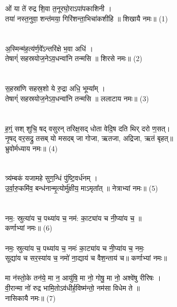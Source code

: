 \subsection{}
ओं या ते॑ रुद्र शि॒वा त॒नूरघो॒राऽपा॑पकाशिनी ।\\
तया॑ नस्त॒नुवा॒ शन्त॑मया॒ गिरि॑शन्ता॒भिचा॑कशीहि ॥ शिखायै नमः॥ (1)\\
{\small{}}\\
\\
अ॒स्मिन्म॑ह॒त्य॑र्ण॒वे᳚ऽन्तरि॑क्षे भ॒वा अधि॑ ।\\
तेषाग्ं॑ सहस्रयोज॒नेऽव॒धन्वा॑नि तन्मसि ॥ शिरसे नमः॥ (2)\\
{\small{}}\\
\\
स॒हस्रा॑णि सहस्र॒शो ये रु॒द्रा अधि॒ भूम्या᳚म् ।\\
तेषाग्ं॑ सहस्रयोज॒नेऽव॒धन्वा॑नि तन्मसि ॥ ललाटाय नमः॥ (3)\\
{\small{}}\\
\\
ह॒ग्ं॒ सश् शुचि॒ षद् वसुरन् तरिक्ष॒सद् धोता वेदि॒ष दति थिर् दरो ण॒सत्।\\
नृ॒षद् वर॒सद्रु तसब् यो मसदब् जा गोजा, ऋतजा, अद्रिजा, ऋतं बृहत्॥ \\
भ्रुवोर्मध्याय नमः॥ (4)\\
{\small{}}\\
\\
त्र्य॑म्बकं यजामहे सुग॒न्धिं पु॑ष्टि॒वर्ध॑नम् ।\\
उ॒र्वा॒रु॒कमि॑व॒ बन्ध॑नान्मृ॒त्योर्मु॑क्षीय॒ माऽमृता᳚त् ॥  नेत्राभ्यां नमः॥ (5)\\
{\small{}}\\
\\
नम॒: स्रुत्या॑य च॒ पथ्या॑य च॒    नम॑: का॒ट्या॑य च नी॒प्या॑य च॒ ॥ \\
कर्णाभ्यां नमः॥ (6)\\
{\small{}}\\
{\small नमः॒ स्रुत्या॑य च॒ पथ्या॑य च॒ नमः॑ का॒ट्या॑य च नी॒प्या॑य च॒ नमः॒\\
सूद्या॑य च सर॒स्या॑य च॒ नमो॑ ना॒द्याय॑ च वैश॒न्ताय॑ च॥ कर्णाभ्यां नमः॥}\\
\\
मा न॑स्तो॒के तन॑ये॒ मा न॒ आयु॑षि॒ मा नो॒ गोषु॒ मा नो॒ अश्वे॑षु रीरिषः ।\\
वी॒रान्मा नो॑ रुद्र भामि॒तोऽव॑धीर्ह॒विष्म॑न्तो॒  नम॑सा विधेम ते ॥  \\
नासिकायै नमः॥ (7)\\
